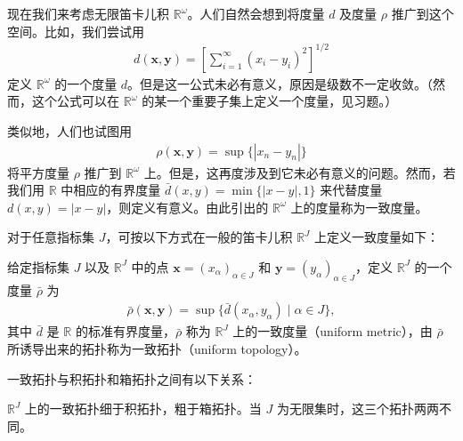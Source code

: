 \documentclass[../../main.tex]{subfiles}
\begin{document}
现在我们来考虑无限笛卡儿积 $\mathbb{R}^{\omega}$。人们自然会想到将度量 $d$ 及度量 $\rho$ 推广到这个空间。比如，我们尝试用
\begin{align*}
d(\boldsymbol{x}, \boldsymbol{y}) = \left[\sum_{i=1}^{\infty} (x_{i} - y_{i})^{2}\right]^{1/2}
\end{align*}
定义 $\mathbb{R}^{\omega}$ 的一个度量 $d$。但是这一公式未必有意义，原因是级数不一定收敛。（然而，这个公式可以在 $\mathbb{R}^{\omega}$ 的某一个重要子集上定义一个度量，见习题。）

类似地，人们也试图用
\begin{align*}
\rho(\boldsymbol{x}, \boldsymbol{y}) = \sup \{|x_{n} - y_{n}|\}
\end{align*}
将平方度量 $\rho$ 推广到 $\mathbb{R}^{\omega}$ 上。但是，这再度涉及到它未必有意义的问题。然而，若我们用 $\mathbb{R}$ 中相应的有界度量 $\bar{d}(x, y) = \min \{|x - y|, 1\}$ 来代替度量 $d(x, y) = |x - y|$，则定义有意义。由此引出的 $\mathbb{R}^{\omega}$ 上的度量称为一致度量。

对于任意指标集 $J$，可按以下方式在一般的笛卡儿积 $\mathbb{R}^{J}$ 上定义一致度量如下：

\begin{definition}[一致度量与一致拓扑]\label{definition:ch02-一致度量}
给定指标集 $J$ 以及 $\mathbb{R}^{J}$ 中的点 $\boldsymbol{x} = (x_{\alpha})_{\alpha \in J}$ 和 $\boldsymbol{y} = (y_{\alpha})_{\alpha \in J}$，定义 $\mathbb{R}^{J}$ 的一个度量 $\bar{\rho}$ 为
\begin{align*}
\bar{\rho}(\boldsymbol{x}, \boldsymbol{y}) = \sup \{\bar{d}(x_{\alpha}, y_{\alpha}) \mid \alpha \in J\},
\end{align*}
其中 $\bar{d}$ 是 $\mathbb{R}$ 的标准有界度量，$\bar{\rho}$ 称为 $\mathbb{R}^{J}$ 上的一致度量（uniform metric），由 $\bar{\rho}$ 所诱导出来的拓扑称为一致拓扑（uniform topology）。
\end{definition}

一致拓扑与积拓扑和箱拓扑之间有以下关系：

\begin{theorem}[一致拓扑的位置]\label{theorem:ch02-一致拓扑位置}
$\mathbb{R}^{J}$ 上的一致拓扑细于积拓扑，粗于箱拓扑。当 $J$ 为无限集时，这三个拓扑两两不同。
\end{theorem}
\end{document}
